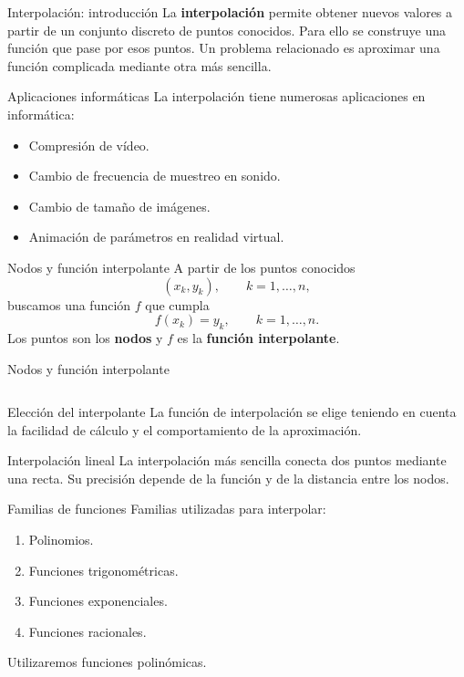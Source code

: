 \documentclass[main.tex]{subfiles}
\begin{document}
\graphicspath{{imagenes/tema9/}{../imagenes/tema9/}}

\begin{frame}[t]{Interpolación: introducción}
La \textbf{interpolación} permite obtener nuevos valores a partir de un conjunto discreto de puntos conocidos.
\bigskip
Para ello se construye una función que pase por esos puntos.
\bigskip
Un problema relacionado es aproximar una función complicada mediante otra más sencilla.
\end{frame}
\begin{frame}[t]{Aplicaciones informáticas}
La interpolación tiene numerosas aplicaciones en informática:
\begin{itemize}
\item Compresión de vídeo.
\item Cambio de frecuencia de muestreo en sonido.
\item Cambio de tamaño de imágenes.
\item Animación de parámetros en realidad virtual.
\end{itemize}
\end{frame}
\begin{frame}[t]{Nodos y función interpolante}
A partir de los puntos conocidos
\[(x_k,y_k),\qquad k=1,\ldots,n,\]
buscamos una función $f$ que cumpla
\[f(x_k)=y_k,\qquad k=1,\ldots,n.\]
Los puntos son los \textbf{nodos} y $f$ es la \textbf{función interpolante}.
\end{frame}
\begin{frame}[t]{Nodos y función interpolante}
\begin{columns}\end{columns}
\end{frame}
\begin{frame}[t]{Elección del interpolante}
La función de interpolación se elige teniendo en cuenta la facilidad de cálculo y el comportamiento de la aproximación.
\end{frame}
\begin{frame}[t]{Interpolación lineal}
La interpolación más sencilla conecta dos puntos mediante una recta.
\medskip
Su precisión depende de la función y de la distancia entre los nodos.
\end{frame}
\begin{frame}[t]{Familias de funciones}
Familias utilizadas para interpolar:
\begin{enumerate}
\item Polinomios.
\item Funciones trigonométricas.
\item Funciones exponenciales.
\item Funciones racionales.
\end{enumerate}
\bigskip
Utilizaremos funciones polinómicas.
\end{frame}
\end{document}
